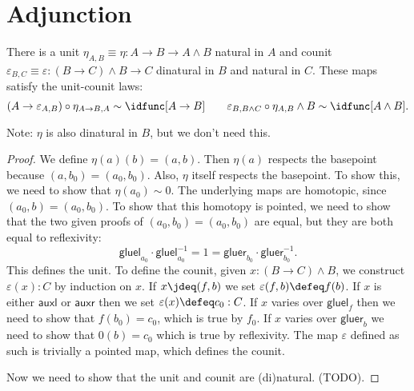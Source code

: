 \documentclass{article}
\newcommand{\pmap}{\to}
\newcommand{\smsh}{\wedge}
\renewcommand{\epsilon}{\varepsilon}
\newcommand{\tr}{\cdot}
\renewcommand{\o}{\ensuremath{\circ}}
\newcommand{\auxl}{\mathsf{auxl}}
\newcommand{\auxr}{\mathsf{auxr}}
\newcommand{\gluel}{\mathsf{gluel}}
\newcommand{\gluer}{\mathsf{gluer}}
\newcommand{\sy}{^{-1}}
\begin{document}
\section{Adjunction}

\begin{lem}\label{lem:unit-counit}
  There is a unit $\eta_{A,B}\equiv\eta:A\pmap B\pmap A\smsh B$ natural in $A$ and counit
  $\epsilon_{B,C}\equiv\epsilon : (B\pmap C)\smsh B \pmap C$ dinatural in $B$ and natural in $C$.
  These maps satisfy the unit-counit laws:
  $$(A\to\epsilon_{A,B})\o \eta_{A\to B,A}\sim \idfunc[A\to B]\qquad
  \epsilon_{B,B\smsh C}\o \eta_{A,B}\smsh B\sim\idfunc[A\smsh B].$$
\end{lem}
Note: $\eta$ is also dinatural in $B$, but we don't need this.
\begin{proof}
  We define $\eta (a)(b)=(a,b)$. Then $\eta (a)$ respects the basepoint because
  $(a,b_0)=(a_0,b_0)$. Also, $\eta$ itself respects the basepoint. To show this, we need to show
  that $\eta (a_0)\sim 0$. The underlying maps are homotopic, since $(a_0,b)=(a_0,b_0)$. To show that
  this homotopy is pointed, we need to show that the two given proofs of $(a_0,b_0)=(a_0,b_0)$ are
  equal, but they are both equal to reflexivity:
  $$\gluel_{a_0}\tr\gluel_{a_0}\sy=1=\gluer_{b_0}\tr\gluer_{b_0}\sy.$$
  This defines the unit. To define the counit, given $x:(B\pmap C)\smsh B$, we construct
  $\epsilon (x):C$ by induction on $x$. If $x\jdeq(f,b)$ we set $\epsilon(f,b)\defeq f(b)$. If $x$
  is either $\auxl$ or $\auxr$ then we set $\epsilon (x)\defeq c_0:C$. If $x$ varies over $\gluel_f$
  then we need to show that $f(b_0)=c_0$, which is true by $f_0$. If $x$ varies over $\gluer_b$ we
  need to show that $0(b)=c_0$ which is true by reflexivity. The map $\epsilon$ defined as such is trivially a pointed map,
  which defines the counit.

  Now we need to show that the unit and counit are (di)natural. (TODO).


\end{proof}
\end{document}
